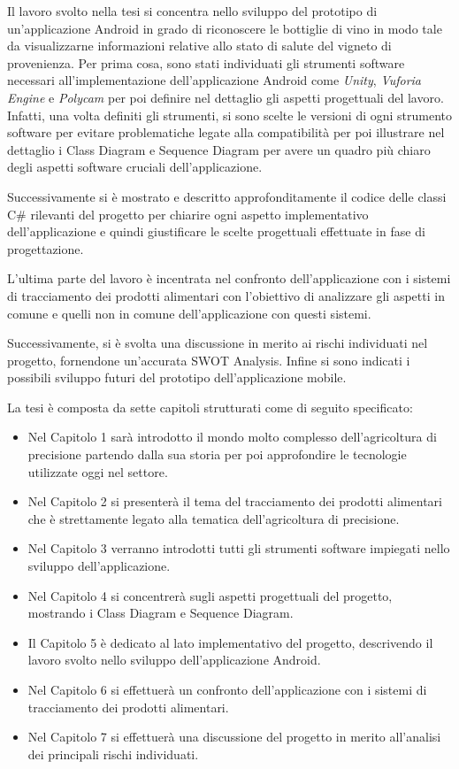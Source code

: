 Il lavoro svolto nella tesi si concentra nello sviluppo del prototipo di un'applicazione Android in grado di riconoscere le bottiglie di vino in modo tale da visualizzarne informazioni relative allo stato di salute del vigneto di provenienza. Per prima cosa, sono stati individuati gli strumenti software necessari all'implementazione dell'applicazione Android come \textit{Unity}, \textit{Vuforia Engine} e \textit{Polycam} per poi definire nel dettaglio gli aspetti progettuali del lavoro. Infatti, una volta definiti gli strumenti, si sono scelte le versioni di ogni strumento software per evitare problematiche legate alla compatibilità per poi illustrare nel dettaglio i Class Diagram e Sequence Diagram per avere un quadro più chiaro degli aspetti software cruciali dell'applicazione.

Successivamente si è mostrato e descritto approfonditamente il codice delle classi C\# rilevanti del progetto per chiarire ogni aspetto implementativo dell'applicazione e quindi giustificare le scelte progettuali effettuate in fase di progettazione.

L'ultima parte del lavoro è incentrata nel confronto dell'applicazione con i sistemi di tracciamento dei prodotti alimentari con l'obiettivo di analizzare gli aspetti in comune e quelli non in comune dell'applicazione con questi sistemi.

Successivamente, si è svolta una discussione in merito ai rischi individuati nel progetto, fornendone un'accurata SWOT Analysis. Infine si sono indicati i possibili sviluppo futuri del prototipo dell'applicazione mobile.

La tesi è composta da sette capitoli strutturati come di seguito specificato:
\begin{itemize}
	\item Nel Capitolo 1 sarà introdotto il mondo molto complesso dell'agricoltura di precisione partendo dalla sua storia per poi approfondire le tecnologie utilizzate oggi nel settore.
	\item Nel Capitolo 2 si presenterà il tema del tracciamento dei prodotti alimentari che è strettamente legato alla tematica dell'agricoltura di precisione.
	\item Nel Capitolo 3 verranno introdotti tutti gli strumenti software impiegati nello sviluppo dell'applicazione.
	\item Nel Capitolo 4 si concentrerà sugli aspetti progettuali del progetto, mostrando i Class Diagram e Sequence Diagram.
	\item Il Capitolo 5 è dedicato al lato implementativo del progetto, descrivendo il lavoro svolto nello sviluppo dell'applicazione Android.
	\item Nel Capitolo 6 si effettuerà un confronto dell'applicazione con i sistemi di tracciamento dei prodotti alimentari.
	\item Nel Capitolo 7 si effettuerà una discussione del progetto in merito all'analisi dei principali rischi individuati.	
\end{itemize}
